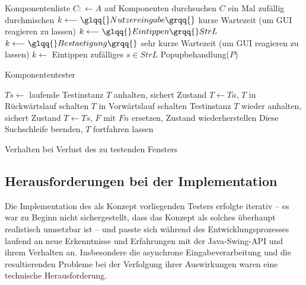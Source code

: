 \begin{algorithm} \SetAlgoLined
	Komponentenliste $C: \longleftarrow A$ auf Komponenten durchsuchen\;
	$C$ ein Mal zufällig durchmischen\;
	{
		{
			$k \longleftarrow \glqq{}Nutzereingabe\grqq{}$\;
			kurze Wartezeit (um GUI reagieren zu lassen)
		}
		{
			{
				$k \longleftarrow \glqq{}Eintippen\grqq{} StrL$\;
				$k \longleftarrow \glqq{}Bestaetigung\grqq{}$\;
				sehr kurze Wartezeit (um GUI reagieren zu lassen)
			}
			$k \longleftarrow$ \glqq{}Eintippen\grqq{} zufälliges $s \in StrL$\;
		}
		{
			Popupbehandlung($P$)\;
		}
	}
	\caption{Komponententester}
	\label{alg:autotestermain}
\end{algorithm}

\begin{algorithm} \SetAlgoLined
	$Ts \longleftarrow$ laufende Testinstanz $T$ anhalten, sichert Zustand\;
	$T \longleftarrow Ta$, $T$ in Rückwärtslauf schalten\;
	{
		{
			$T$ in Vorwärtslauf schalten\;
			Testinstanz $T$ wieder anhalten, sichert Zustand\;
			$T \longleftarrow Ts$, $F$ mit $Fn$ ersetzen, Zustand wiederherstellen\;
			Diese Suchschleife beenden, $T$ fortfahren lassen\;
		}
	}
	
	\caption{Verhalten bei Verlust des zu testenden Fensters}
	\label{alg:autotesterwindowloss}
\end{algorithm}


\subsection{Herausforderungen bei der Implementation}

Die Implementation des als Konzept vorliegenden Testers erfolgte iterativ
-- es war zu Beginn nicht sichergestellt, dass das Konzept als solches
überhaupt realistisch umsetzbar ist -- und passte sich während des
Entwicklungsprozesses laufend an neue Erkenntnisse und Erfahrungen
mit der Java-Swing-API und ihrem Verhalten an. Insbesondere
die asynchrone Eingabeverarbeitung und die resultierenden Probleme
bei der Verfolgung ihrer Auswirkungen waren eine technische Herausforderung.

